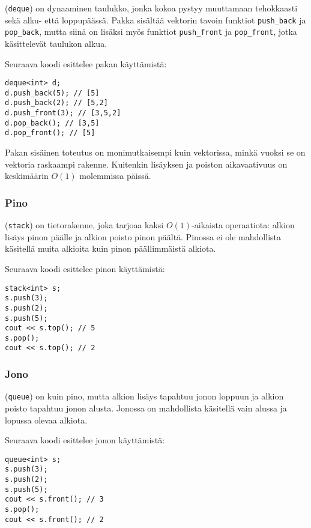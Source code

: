 
 (\texttt{deque}) on dynaaminen taulukko,
jonka kokoa pystyy muuttamaan tehokkaasti
sekä alku- että loppupäässä.
Pakka sisältää vektorin tavoin
funktiot \texttt{push\_back}
ja \texttt{pop\_back}, mutta siinä on lisäksi myös funktiot
\texttt{push\_front} ja \texttt{pop\_front},
jotka käsittelevät taulukon alkua.

Seuraava koodi esittelee pakan käyttämistä:

\begin{lstlisting}
deque<int> d;
d.push_back(5); // [5]
d.push_back(2); // [5,2]
d.push_front(3); // [3,5,2]
d.pop_back(); // [3,5]
d.pop_front(); // [5]
\end{lstlisting}

Pakan sisäinen toteutus on monimutkaisempi kuin
vektorissa, minkä vuoksi se on
vektoria raskaampi rakenne.
Kuitenkin lisäyksen ja poiston
aikavaativuus on keskimäärin $O(1)$ molemmissa päissä.

\subsubsection{Pino}


 (\texttt{stack}) on tietorakenne,
joka tarjoaa kaksi $O(1)$-aikaista
operaatiota:
alkion lisäys pinon päälle ja alkion
poisto pinon päältä.
Pinossa ei ole mahdollista käsitellä muita
alkioita kuin pinon päällimmäistä alkiota.

Seuraava koodi esittelee pinon käyttämistä:

\begin{lstlisting}
stack<int> s;
s.push(3);
s.push(2);
s.push(5);
cout << s.top(); // 5
s.pop();
cout << s.top(); // 2
\end{lstlisting}
\subsubsection{Jono}


 (\texttt{queue}) on kuin pino,
mutta alkion lisäys tapahtuu jonon loppuun
ja alkion poisto tapahtuu jonon alusta.
Jonossa on mahdollista käsitellä vain
alussa ja lopussa olevaa alkiota.

Seuraava koodi esittelee jonon käyttämistä:

\begin{lstlisting}
queue<int> s;
s.push(3);
s.push(2);
s.push(5);
cout << s.front(); // 3
s.pop();
cout << s.front(); // 2
\end{lstlisting}
% 


